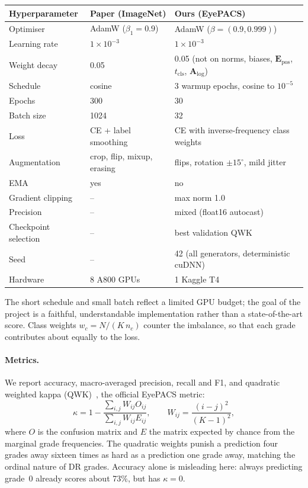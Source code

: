 \documentclass[11pt,a4paper]{article}
\begin{document}
\begin{center}
\begin{tabular}{p{3.6cm}p{4.2cm}p{6.4cm}}
\toprule
Hyperparameter & Paper (ImageNet) & Ours (EyePACS) \\
\midrule
Optimiser          & AdamW ($\beta_1=0.9$) & AdamW ($\beta=(0.9, 0.999)$) \\
Learning rate      & $1\times10^{-3}$ & $1\times10^{-3}$ \\
Weight decay       & 0.05 & 0.05 (not on norms, biases, $\mathbf{E}_{\mathrm{pos}}$, $t_{\mathrm{cls}}$, $\mathbf{A}_{\log}$) \\
Schedule           & cosine & 3 warmup epochs, cosine to $10^{-5}$ \\
Epochs             & 300 & 30 \\
Batch size         & 1024 & 32 \\
Loss               & CE + label smoothing & CE with inverse-frequency class weights \\
Augmentation       & crop, flip, mixup, erasing & flips, rotation $\pm15^\circ$, mild jitter \\
EMA                & yes & no \\
Gradient clipping  & -- & max norm 1.0 \\
Precision          & -- & mixed (float16 autocast) \\
Checkpoint selection & -- & best validation QWK \\
Seed               & -- & 42 (all generators, deterministic cuDNN) \\
Hardware           & 8 A800 GPUs & 1 Kaggle T4 \\
\bottomrule
\end{tabular}
\end{center}

The short schedule and small batch reflect a limited GPU budget; the goal of the
project is a faithful, understandable implementation rather than a state-of-the-art
score. Class weights $w_c = N/(K\,n_c)$ counter the imbalance, so that each grade
contributes about equally to the loss.

\paragraph{Metrics.} We report accuracy, macro-averaged precision, recall and F1, and
quadratic weighted kappa (QWK)~\cite{cohen1968weighted}, the official EyePACS
metric:
\[
  \kappa = 1 - \frac{\sum_{i,j} W_{ij} O_{ij}}{\sum_{i,j} W_{ij} E_{ij}},\qquad
  W_{ij} = \frac{(i-j)^2}{(K-1)^2},
\]
where $O$ is the confusion matrix and $E$ the matrix expected by chance from the
marginal grade frequencies. The quadratic weights punish a prediction four grades
away sixteen times as hard as a prediction one grade away, matching the ordinal
nature of DR grades. Accuracy alone is misleading here: always predicting grade~0
already scores about 73\%, but has $\kappa=0$.
\end{document}
